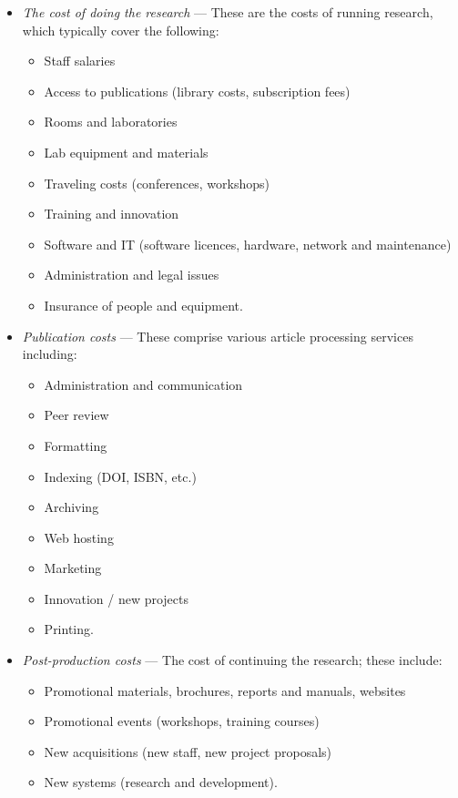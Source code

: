 \documentclass[graybox,envcountchap,sectrefs,UStrade]{svmono}
\begin{document}
\begin{itemize}
  \item \emph{The cost of doing the research} --- These are the costs of running research, which typically cover the following:
   \begin{itemize}
     \item Staff salaries
     \item Access to publications (library costs, subscription fees)
     \item Rooms and laboratories
     \item Lab equipment and materials
     \item Traveling costs (conferences, workshops)
     \item Training and innovation
     \item Software and IT (software licences, hardware, network and maintenance)
     \item Administration and legal issues
     \item Insurance of people and equipment.
   \end{itemize}
  \item \emph{Publication costs} --- These comprise various article processing services including:
    \begin{itemize}
      \item Administration and communication
      \item Peer review
      \item Formatting
      \item Indexing (DOI, ISBN, etc.)
      \item Archiving
      \item Web hosting
      \item Marketing
      \item Innovation / new projects
      \item Printing.
    \end{itemize}
  \item \emph{Post-production costs} --- The cost of continuing the research; these include:
    \begin{itemize}
      \item Promotional materials, brochures, reports and manuals, websites
      \item Promotional events (workshops, training courses)
      \item New acquisitions (new staff, new project proposals)
      \item New systems (research and development).
    \end{itemize}
\end{itemize}
\end{document}
